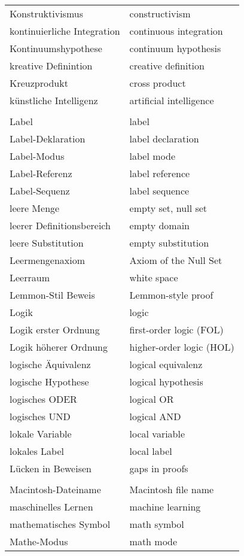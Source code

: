 \begin{longtabu}   { @{} X[l] X[l] }
    Konstruktivismus & constructivism \\
    kontinuierliche Integration & continuous integration \\
    Kontinuumshypothese & continuum hypothesis \\
    kreative Definintion & creative definition \\
    Kreuzprodukt & cross product \\
    künstliche Intelligenz & artificial intelligence \\
     & \\
    Label & label \\
    Label-Deklaration & label declaration \\
    Label-Modus & label mode \\
    Label-Referenz & label reference \\
    Label-Sequenz & label sequence \\
    leere Menge & empty set, null set \\
    leerer Definitionsbereich & empty domain \\
    leere Substitution & empty substitution \\
    Leermengenaxiom & Axiom of the Null Set \\
    Leerraum & white space \\
    Lemmon-Stil Beweis & Lemmon-style proof \\
    Logik & logic \\
    Logik erster Ordnung & first-order logic (FOL) \\
    Logik höherer Ordnung & higher-order logic (HOL) \\
    logische Äquivalenz & logical equivalenz \\
    logische Hypothese & logical hypothesis \\
    logisches ODER & logical OR \\
    logisches UND & logical AND \\
    lokale Variable & local variable \\
    lokales Label & local label \\
    Lücken in Beweisen & gaps in proofs \\
     & \\
    Macintosh-Dateiname & Macintosh file name \\
    maschinelles Lernen & machine learning \\
    mathematisches Symbol & math symbol \\
    Mathe-Modus & math mode \\

\end{longtabu}
